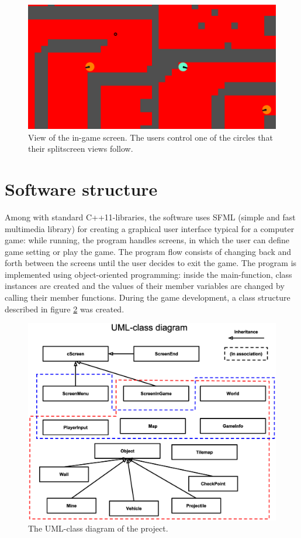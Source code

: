 \documentclass{article} %
\begin{document}
\begin{figure}[H]
\centering
\includegraphics[width=120mm]{images/splitscreen}
\caption{View of the in-game screen. The users control one of the circles that their splitscreen views follow.}
\label{ingame}
\end{figure} 

\section{Software structure}
Among with standard C++11-libraries, the software uses SFML (simple and fast multimedia library) for creating a graphical user interface typical for a computer game: while running, the program handles screens, in which the user can define game setting or play the game. The program flow consists of changing back and forth between the screens until the user decides to exit the game. The program is implemented using object-oriented programming: inside the main-function, class instances are created and the values of their member variables are changed by calling their member functions. During the game development, a class structure described in figure \ref{uml} was created.

\begin{figure}[H]
\centering
\includegraphics[width=120mm]{images/uml}
\caption{The UML-class diagram of the project.}
\label{uml}
\end{figure}  
\end{document}
